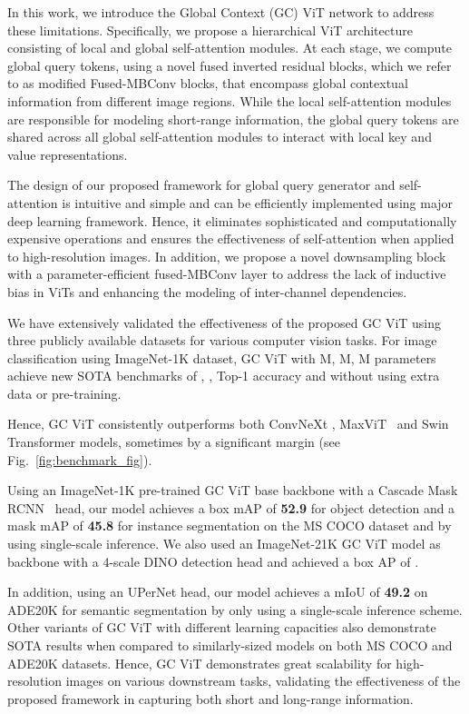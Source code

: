 \documentclass{article}
\theoremstyle{plain}
\theoremstyle{definition}
\theoremstyle{remark}
\begin{document}
In this work, we introduce the Global Context (GC) ViT network to address these limitations. Specifically, we propose a hierarchical ViT architecture consisting of local and global self-attention modules. At each stage, we compute global query tokens, using a novel fused inverted residual blocks, which we refer to as modified Fused-MBConv blocks, that encompass global contextual information from different image regions. While the local self-attention modules are responsible for modeling short-range information, the global query tokens are shared across all global self-attention modules to interact with local key and value representations. 

The design of our proposed framework for global query generator and self-attention is intuitive and simple and can be efficiently implemented using major deep learning framework. Hence, it eliminates sophisticated and computationally expensive operations and ensures the effectiveness of self-attention when applied to high-resolution images. In addition, we propose a novel downsampling block with a parameter-efficient fused-MBConv layer to address the lack of inductive bias in ViTs and enhancing the modeling of inter-channel dependencies.  

We have extensively validated the effectiveness of the proposed GC ViT using three publicly available datasets for various computer vision tasks. For image classification using ImageNet-1K dataset, GC ViT with M, M, M parameters achieve new SOTA benchmarks of , ,  Top-1 accuracy and without using extra data or pre-training. 

Hence, GC ViT consistently outperforms both ConvNeXt \citep{liu2022convnet}, MaxViT~\citep{tu2022maxvit} and Swin Transformer \citep{liu2021swin} models, sometimes by a significant margin (see Fig.~\ref{fig:benchmark_fig}). 

Using an ImageNet-1K pre-trained GC ViT base backbone with a Cascade Mask RCNN~\citep{he2017mask} head, our model achieves a box mAP of \textbf{52.9} for object detection and a mask mAP of \textbf{45.8} for instance segmentation on the MS COCO dataset and by using single-scale inference. We also used an ImageNet-21K GC ViT model as backbone with a 4-scale DINO detection head and achieved a box AP of . 

In addition, using an UPerNet \citep{xiao2018unified} head, our model achieves a mIoU of \textbf{49.2} on ADE20K for semantic segmentation by only using a single-scale inference scheme. Other variants of GC ViT with different learning capacities also demonstrate SOTA results when compared to similarly-sized models on both MS COCO and ADE20K datasets. Hence, GC ViT demonstrates great scalability for high-resolution images on various downstream tasks, validating the effectiveness of the proposed framework in capturing both short and long-range information.  
\end{document}
